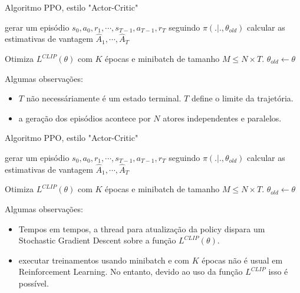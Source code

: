 \documentclass{beamer}
\begin{document}
\begin{frame}{Algoritmo PPO, estilo "Actor-Critic"}
	
	\begin{algorithmic} 
		\STATE \TA gerar um episódio ${s_{0},a_{0},r_{1},\cdots,s_{T-1},a_{T-1},r_{T}}$ seguindo $\pi(.|.,\theta_{old})$
		\STATE \TA calcular as estimativas de vantagem $\hat{A}_{1}, \cdots, \hat{A}_{T}$
		\ENDFOR
		
		\STATE Otimiza $L^{CLIP}(\theta)$ com $K$ épocas e minibatch de tamanho $M \leq N \times T$. 
		\STATE $\theta_{old} \leftarrow \theta$
		
		\ENDFOR
	\end{algorithmic}	
	
	Algumas observações: 
	
	\begin{itemize}
		\item $T$ não necessáriamente é um estado terminal. $T$ define o limite da trajetória. 
		\item a geração dos episódios acontece por $N$ atores independentes e paralelos.
	\end{itemize}
	
\end{frame}

\begin{frame}{Algoritmo PPO, estilo "Actor-Critic"}
	
	\begin{algorithmic} 
		\FOR {iterações=1,2,$\cdots$}
		\FOR {actor=1,2,$\cdots$, N}
		\STATE gerar um episódio ${s_{0},a_{0},r_{1},\cdots,s_{T-1},a_{T-1},r_{T}}$ seguindo $\pi(.|.,\theta_{old})$
		\STATE calcular as estimativas de vantagem $\hat{A}_{1}, \cdots, \hat{A}_{T}$
		\ENDFOR
		
		\STATE \TB Otimiza $L^{CLIP}(\theta)$ com $K$ épocas e minibatch de tamanho $M \leq N \times T$. 
		\STATE \TB $\theta_{old} \leftarrow \theta$
		
		\ENDFOR
	\end{algorithmic}	
	
	Algumas observações: 
	
	\begin{itemize}
		\item Tempos em tempos, a thread para atualização da policy dispara um Stochastic Gradient Descent sobre a função $L^{CLIP}(\theta)$. 
		\item executar treinamentos usando minibatch e com $K$ épocas não é usual em Reinforcement Learning. No entanto, devido ao uso da função $L^{CLIP}$ isso é possível.  
	\end{itemize}
	
\end{frame}
\end{document}
